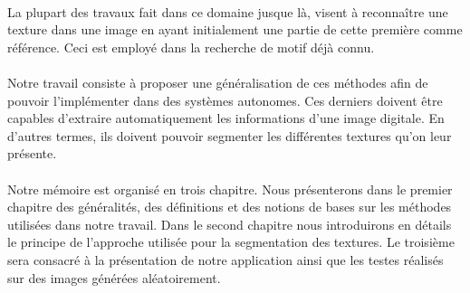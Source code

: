 \paragraph*{}
La plupart des travaux fait dans ce domaine jusque là, visent à reconnaître une texture dans une image en ayant initialement une partie de cette première comme référence. Ceci est employé dans la recherche de motif déjà connu.

\paragraph*{}
Notre travail consiste à proposer une généralisation de ces méthodes afin de pouvoir l'implémenter dans des systèmes autonomes. Ces derniers doivent être capables d'extraire automatiquement les informations d'une image digitale. En d'autres termes, ils doivent pouvoir segmenter les différentes textures qu'on leur présente.\\


\paragraph*{}
Notre mémoire est organisé en trois chapitre. Nous présenterons dans le premier chapitre des généralités, des définitions et des notions de bases sur les méthodes utilisées dans notre travail. Dans le second chapitre nous introduirons en détails le principe de l'approche utilisée pour la segmentation des textures. Le troisième sera consacré à la présentation de notre application ainsi que les testes réalisés sur des images générées aléatoirement.

